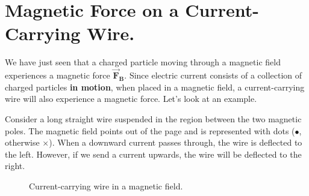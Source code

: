\documentclass[11pt, letterpaper]{article}
\theoremstyle{definition}
\theoremstyle{remark}
\newcommand{\bv}[2][]{\bm{\vec{#2}_{#1}}}
\begin{document}
\section{Magnetic Force on a Current-Carrying Wire.}\label{sec:wire}
We have just seen that a charged particle moving through a magnetic field experiences a magnetic force $\bv[B]{F}$. Since electric current consists of a collection of charged particles \textbf{in motion}, when placed in a magnetic field, a current-carrying wire will also experience a magnetic force. Let's look at an example. 

Consider a long straight wire suspended in the region between the two magnetic poles. The magnetic field points out of the page and is represented with dots ($\bullet$, otherwise $\times$). When a downward current passes through, the wire is deflected to the left. However, if we send a current upwards, the wire will be deflected to the right.
\begin{figure}[h!]
		\centering
		\qquad
		\qquad
		\caption{Current-carrying wire in a magnetic field.}
\end{figure}
\end{document}
